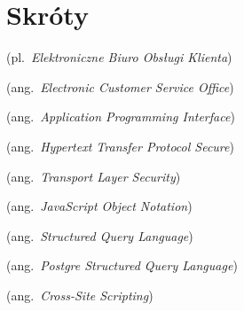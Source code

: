 % 
\chapter*{Skróty}
\label{sec:skroty}
\noindent\vspace{-\topsep-\partopsep-\parsep} %
\begin{description}[labelwidth=*]
  \item [eBOK] (pl.\ \emph{Elektroniczne Biuro Obsługi Klienta})
  \item [eCSO] (ang.\ \emph{Electronic Customer Service Office})
  \item [API] (ang.\ \emph{Application Programming Interface})
  \item [HTTPS] (ang.\ \emph{Hypertext Transfer Protocol Secure})
  \item [TLS] (ang.\ \emph{Transport Layer Security})
  \item [JSON] (ang.\ \emph{JavaScript Object Notation})
  \item [SQL] (ang.\ \emph{Structured Query Language})
  \item [PostgreSQL] (ang.\ \emph{Postgre Structured Query Language})
  \item [XSS] (ang.\ \emph{Cross-Site Scripting})
\end{description}
